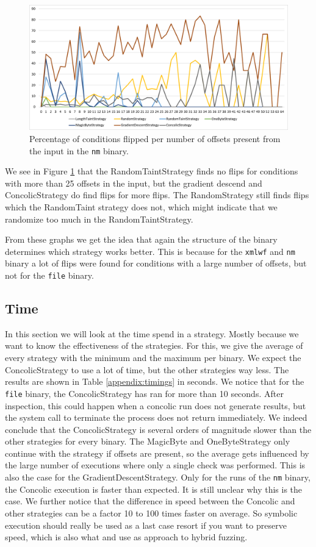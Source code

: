 \begin{figure}[H]
    \centering
    \includegraphics[width=.8\linewidth]{5_results/graphs/nm-offsets.png}  
    \caption{Percentage of conditions flipped per number of offsets present from the input in the \texttt{nm} binary.}
    \label{fig:nmOffsets}
\end{figure}
We see in Figure \ref{fig:nmOffsets} that the RandomTaintStrategy finds no flips for conditions with more than 25 offsets in the input, but the gradient descend and ConcolicStrategy do find flips for more flips. The RandomStrategy still finds flips which the RandomTaint strategy does not, which might indicate that we randomize too much in the RandomTaintStrategy.

From these graphs we get the idea that again the structure of the binary determines which strategy works better. This is because for the \texttt{xmlwf} and \texttt{nm} binary a lot of flips were found for conditions with a large number of offsets, but not for the \texttt{file} binary.




\subsection{Time}
In this section we will look at the time spend in a strategy.
Mostly because we want to know the effectiveness of the strategies. For this, we give the average of every strategy with the minimum and the maximum per binary. We expect the ConcolicStrategy to use a lot of time, but the other strategies way less.
The results are shown in Table \ref{appendix:timings} in seconds.
We notice that for the \texttt{file} binary, the ConcolicStrategy has ran for more than 10 seconds. After inspection, this could happen when a concolic run does not generate results, but the system call to terminate the process does not return immediately.
We indeed conclude that the ConcolicStrategy is several orders of magnitude slower than the other strategies for every binary. The MagicByte and OneByteStrategy only continue with the strategy if offsets are present, so the average gets influenced by the large number of executions where only a single check was performed.
This is also the case for the GradientDescentStrategy. Only for the runs of the \texttt{nm} binary, the Concolic execution is faster than expected. It is still unclear why this is the case. 
We further notice that the difference in speed between the Concolic and other strategies can be a factor 10 to 100 times faster on average. So symbolic execution should really be used as a last case resort if you want to preserve speed, which is also what \cite{stephens2016driller} and \cite{han2019synfuzz} use as approach to hybrid fuzzing.


